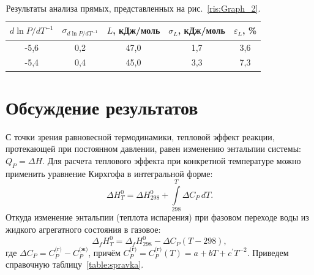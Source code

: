 \documentclass[a4paper,12pt]{article} %
\begin{document}
\begin{table}[H]
\caption{Результаты анализа прямых, представленных на рис.~\ref{ris:Graph_2}.}
\label{table:results_2}
\begin{tabular}{|c|c|c|c|c|}
\hline
$d\ln P / dT^{-1}$ & $\sigma_{d\ln P / dT^{-1}}$ & $L$, кДж/моль & $\sigma_L$, кДж/моль & $\varepsilon_L$, \% \\ \hline
-5,6               & 0,2                         & 47,0          & 1,7                  & 3,6                 \\ \hline
-5,4               & 0,4                         & 45,0          & 3,3                  & 7,3                 \\ \hline
\end{tabular}
\end{table}	

\section{Обсуждение результатов}
	С точки зрения равновесной термодинамики, тепловой эффект реакции, протекающей при постоянном давлении, равен изменению энтальпии системы: $Q_P = \Delta H$. Для расчета теплового эффекта при конкретной температуре можно применить уравнение Кирхгофа в интегральной форме:
\begin{equation}
	\Delta H_T^0 = \Delta H_{298}^0 + \int\limits_{298}^T \Delta C_P\,dT.
\end{equation}
	Откуда изменение энтальпии (теплота испарения) при фазовом переходе воды из жидкого агрегатного состояния в газовое:
\begin{equation}
	\label{entalpia}
	\Delta_f H_T^0 = \Delta_f H_{298}^0 - \Delta C_P (T-298),
\end{equation}
где $\Delta C_P = C_P^{\text{(г)}} - C_P^{\text{(ж)}}$, причём $C_P^{\text{(г)}} = C_P^{\text{(г)}} (T) = a + bT + c^\prime T^{-2}$. Приведем справочную таблицу~\ref{table:spravka}.
\end{document}
